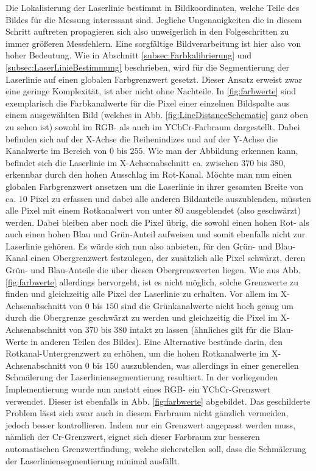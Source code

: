 Die Lokalisierung der Laserlinie bestimmt in Bildkoordinaten, welche Teile des Bildes für die Messung interessant sind. Jegliche Ungenauigkeiten die in diesem Schritt auftreten propagieren sich also unweigerlich in den Folgeschritten zu immer größeren Messfehlern. Eine sorgfältige Bildverarbeitung ist hier also von hoher Bedeutung.\bigbreak
Wie in Abschnitt \ref{subsec:Farbkalibrierung} und \ref{subsec:LaserLinieBestimmung} beschrieben, wird für die Segmentierung der Laserlinie auf einen globalen Farbgrenzwert gesetzt. Dieser Ansatz erweist zwar eine geringe Komplexität, ist aber nicht ohne Nachteile. In \ref{fig:farbwerte} sind exemplarisch die Farbkanalwerte für die Pixel einer einzelnen Bildspalte aus einem ausgewählten Bild (welches in Abb. \ref{fig:LineDistanceSchematic} ganz oben zu sehen ist) sowohl im RGB- als auch im YCbCr-Farbraum dargestellt. Dabei befinden sich auf der X-Achse die Reihenindizes und auf der Y-Achse die Kanalwerte im Bereich von \(0\) bis \(255\). Wie man der Abbildung erkennen kann, befindet sich die Laserlinie im X-Achsenabschnitt ca. zwischen \(370\) bis \(380\), erkennbar durch den hohen Ausschlag im Rot-Kanal. Möchte man nun einen globalen Farbgrenzwert ansetzen um die Laserlinie in ihrer gesamten Breite von ca. \(10\) Pixel zu erfassen und dabei alle anderen Bildanteile auszublenden, müssten alle Pixel mit einem Rotkanalwert von unter \(80\) ausgeblendet (also geschwärzt) werden. Dabei bleiben aber noch die Pixel übrig, die sowohl einen hohen Rot- als auch einen hohen Blau und Grün-Anteil aufweisen und somit ebenfalls nicht zur Laserlinie gehören. Es würde sich nun also anbieten, für den Grün- und Blau-Kanal einen Obergrenzwert festzulegen, der zusätzlich alle Pixel schwärzt, deren Grün- und Blau-Anteile die über diesen Obergrenzwerten liegen. Wie aus Abb. \ref{fig:farbwerte} allerdings hervorgeht, ist es nicht möglich, solche Grenzwerte zu finden und gleichzeitig alle Pixel der Laserlinie zu erhalten. Vor allem im X-Achsenabschnitt von \(0\) bis \(150\) sind die Grünkanalwerte nicht hoch genug um durch die Obergrenze geschwärzt zu werden und gleichzeitig die Pixel im X-Achsenabschnitt von \(370\) bis \(380\) intakt zu lassen (ähnliches gilt für die Blau-Werte in anderen Teilen des Bildes). Eine Alternative bestünde darin, den Rotkanal-Untergrenzwert zu erhöhen, um die hohen Rotkanalwerte im X-Achsenabschnitt von \(0\) bis \(150\) auszublenden, was allerdings in einer generellen Schmälerung der Laserliniensegmentierung resultiert.\linebreak
In der vorliegenden Implementierung wurde nun anstatt eines RGB- ein YCbCr-Grenzwert verwendet. Dieser ist ebenfalls in Abb. \ref{fig:farbwerte} abgebildet. Das geschilderte Problem lässt sich zwar auch in diesem Farbraum nicht gänzlich vermeiden, jedoch besser kontrollieren. Indem nur ein Grenzwert angepasst werden muss, nämlich der Cr-Grenzwert, eignet sich dieser Farbraum zur besseren automatischen Grenzwertfindung, welche sicherstellen soll, dass die Schmälerung der Laserliniensegmentierung minimal ausfällt.   
